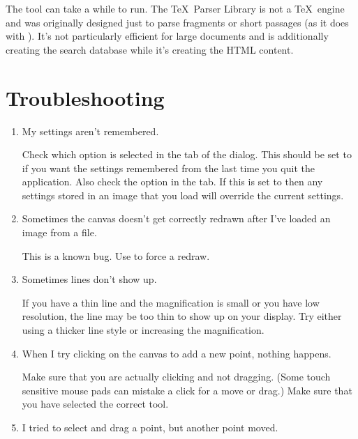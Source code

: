 \begin{information}
The  tool can take a while to run.
The \TeX\ Parser Library is not a \TeX\ engine and was originally
designed just to parse fragments or short passages (as it does with
). It's not particularly efficient for large
documents and  is additionally creating the
search database while it's creating the HTML content.
\end{information}

\chapter{Troubleshooting}\label{sec:troubleshooting}

\begin{enumerate}
\item My settings aren't remembered.

Check which option is selected in the
 tab of the
 dialog. This should be set to
 if you want the settings
remembered from the last time you quit the application. Also check
the  option in the  tab.
If this is set to  then any settings
stored in an image that you load will override the current settings.

\item Sometimes the canvas doesn't get correctly redrawn after I've
loaded an image from a file.

This is a known bug. Use  to force a redraw.

\item Sometimes lines don't show up.

If you have a thin line and the magnification is small or you
have low resolution, the line may be too thin to show up on your
display. Try either using a thicker line style or increasing the
magnification.

\item When I try clicking on the canvas to add a new point, nothing
happens.

Make sure that you are actually clicking and not dragging. (Some
touch sensitive mouse pads can mistake a click for a move or drag.)
Make sure that you have selected the correct tool.

\item I tried to select and drag a point, but another point moved.


\end{enumerate}
